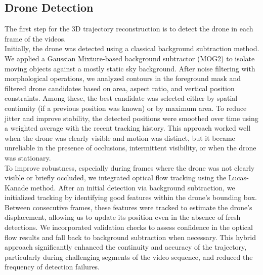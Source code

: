 \documentclass[11pt]{article}
\begin{document}
\subsection{Drone Detection}

The first step for the 3D trajectory reconstruction is to detect the drone in each frame of the videos.\\

Initially, the drone was detected using a classical background subtraction method. We applied a Gaussian Mixture-based background subtractor (MOG2) to isolate moving objects against a mostly static sky background. After noise filtering with morphological operations, we analyzed contours in the foreground mask and filtered drone candidates based on area, aspect ratio, and vertical position constraints. Among these, the best candidate was selected either by spatial continuity (if a previous position was known) or by maximum area. To reduce jitter and improve stability, the detected positions were smoothed over time using a weighted average with the recent tracking history. This approach worked well when the drone was clearly visible and motion was distinct, but it became unreliable in the presence of occlusions, intermittent visibility, or when the drone was stationary.\\

To improve robustness, especially during frames where the drone was not clearly visible or briefly occluded, we integrated optical flow tracking using the Lucas-Kanade method. After an initial detection via background subtraction, we initialized tracking by identifying good features within the drone's bounding box. Between consecutive frames, these features were tracked to estimate the drone's displacement, allowing us to update its position even in the absence of fresh detections. We incorporated validation checks to assess confidence in the optical flow results and fall back to background subtraction when necessary. This hybrid approach significantly enhanced the continuity and accuracy of the trajectory, particularly during challenging segments of the video sequence, and reduced the frequency of detection failures.
\end{document}
